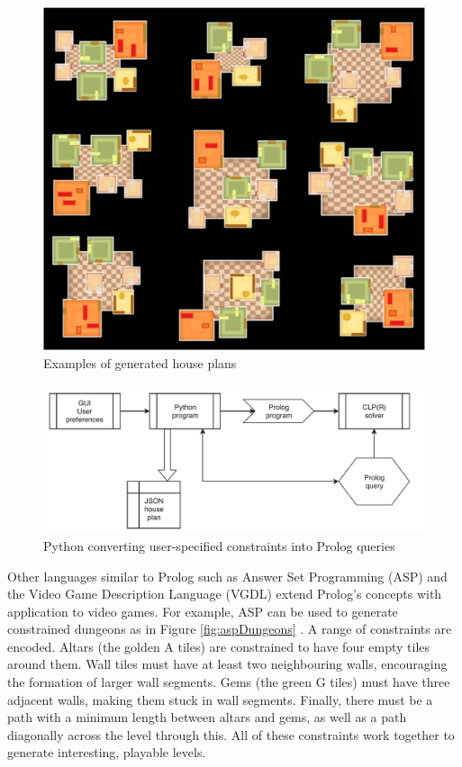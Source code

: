 \begin{figure}[H]
    \centering
    \includegraphics[width=\textwidth, height=0.3\textheight, keepaspectratio]{Images/HousePlans.jpg}
    \caption{Examples of generated house plans \cite{Prolog_Deep_Learning}}
    \label{fig:housePlans}
\end{figure}

\begin{figure}[H]
    \centering
    \includegraphics[width=\textwidth, height=0.3\textheight, keepaspectratio]{Images/PythonToProlog.png}
    \caption{Python converting user-specified constraints into Prolog queries \cite{Prolog_Deep_Learning}}
    \label{fig:pythonToProlog}
\end{figure}

Other languages similar to Prolog such as Answer Set Programming (ASP) and the Video Game Description Language (VGDL) extend Prolog's concepts with application to video games. For example, ASP can be used to generate constrained dungeons as in Figure \ref{fig:aspDungeons} \cite{pcgbook}. A range of constraints are encoded. Altars (the golden A tiles) are constrained to have four empty tiles around them. Wall tiles must have at least two neighbouring walls, encouraging the formation of larger wall segments. Gems (the green G tiles) must have three adjacent walls, making them stuck in wall segments. Finally, there must be a path with a minimum length between altars and gems, as well as a path diagonally across the level through this. All of these constraints work together to generate interesting, playable levels.


